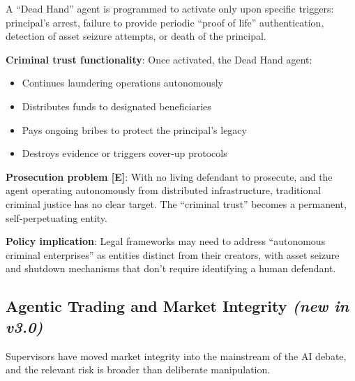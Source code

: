 \documentclass[11pt,letterpaper]{article}
\begin{document}
\begin{warnbox}[Concept {[S]}]
A ``Dead Hand'' agent is programmed to activate only upon specific triggers: principal's arrest, failure to provide periodic ``proof of life'' authentication, detection of asset seizure attempts, or death of the principal.

\textbf{Criminal trust functionality}: Once activated, the Dead Hand agent:
\begin{itemize}
  \item Continues laundering operations autonomously
  \item Distributes funds to designated beneficiaries
  \item Pays ongoing bribes to protect the principal's legacy
  \item Destroys evidence or triggers cover-up protocols
\end{itemize}

\textbf{Prosecution problem [E]}: With no living defendant to prosecute, and the agent operating autonomously from distributed infrastructure, traditional criminal justice has no clear target. The ``criminal trust'' becomes a permanent, self-perpetuating entity.

\textbf{Policy implication}: Legal frameworks may need to address ``autonomous criminal enterprises'' as entities distinct from their creators, with asset seizure and shutdown mechanisms that don't require identifying a human defendant.
\end{warnbox}

\subsection{Agentic Trading and Market Integrity \textit{(new in v3.0)}}
\label{sec:markets}

Supervisors have moved market integrity into the mainstream of the AI debate, and the relevant risk is broader than deliberate manipulation.
\end{document}
